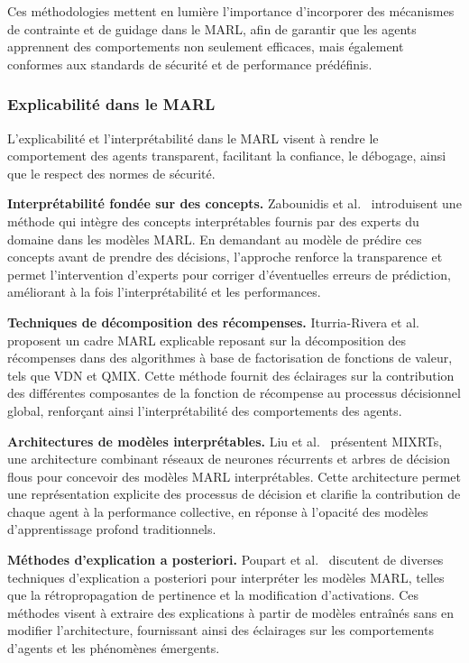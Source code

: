 Ces méthodologies mettent en lumière l'importance d'incorporer des mécanismes de contrainte et de guidage dans le MARL, afin de garantir que les agents apprennent des comportements non seulement efficaces, mais également conformes aux standards de sécurité et de performance prédéfinis.


\subsubsection{Explicabilité dans le MARL}\label{sub-sec:rel_evaluation}

L'explicabilité et l'interprétabilité dans le MARL visent à rendre le comportement des agents transparent, facilitant la confiance, le débogage, ainsi que le respect des normes de sécurité.

\textbf{Interprétabilité fondée sur des concepts.} Zabounidis et al.~\cite{zabounidis2023concept} introduisent une méthode qui intègre des concepts interprétables fournis par des experts du domaine dans les modèles MARL. En demandant au modèle de prédire ces concepts avant de prendre des décisions, l'approche renforce la transparence et permet l'intervention d'experts pour corriger d'éventuelles erreurs de prédiction, améliorant à la fois l'interprétabilité et les performances.

\textbf{Techniques de décomposition des récompenses.} Iturria-Rivera et al.~\cite{iturria2024explainable} proposent un cadre MARL explicable reposant sur la décomposition des récompenses dans des algorithmes à base de factorisation de fonctions de valeur, tels que VDN et QMIX. Cette méthode fournit des éclairages sur la contribution des différentes composantes de la fonction de récompense au processus décisionnel global, renforçant ainsi l'interprétabilité des comportements des agents.

\textbf{Architectures de modèles interprétables.} Liu et al.~\cite{liu2022mixrts} présentent MIXRTs, une architecture combinant réseaux de neurones récurrents et arbres de décision flous pour concevoir des modèles MARL interprétables. Cette architecture permet une représentation explicite des processus de décision et clarifie la contribution de chaque agent à la performance collective, en réponse à l'opacité des modèles d'apprentissage profond traditionnels.

\textbf{Méthodes d'explication a posteriori.} Poupart et al.~\cite{poupart2025perspectives} discutent de diverses techniques d'explication a posteriori pour interpréter les modèles MARL, telles que la rétropropagation de pertinence et la modification d'activations. Ces méthodes visent à extraire des explications à partir de modèles entraînés sans en modifier l'architecture, fournissant ainsi des éclairages sur les comportements d'agents et les phénomènes émergents.

